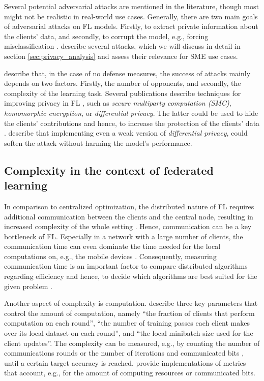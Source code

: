 Several potential adversarial attacks are mentioned in the literature, though most might not be realistic in real-world use cases. Generally, there are two main goals of adversarial attacks on FL models. Firstly, to extract private information about the clients' data, and secondly, to corrupt the model, e.g., forcing misclassification \citep{enthoven2021overview}. \citet{enthoven2021overview} describe several attacks, which we will discuss in detail in section \ref{sec:privacy_analysis} and assess their relevance for SME use cases.

\citet{sun2019can} describe that, in the case of no defense measures, the success of attacks mainly depends on two factors. Firstly, the number of opponents, and secondly, the complexity of the learning task. Several publications describe techniques for improving privacy in FL \citep{yang2019federated, naseri2020toward, sun2019can}, such as \emph{secure multiparty computation (SMC)}, \emph{homomorphic encryption}, or \emph{differential privacy}. The latter could be used to hide the clients' contributions and hence, to increase the protection of the clients' data \citep{yang2019federated}. \citet{sun2019can} describe that implementing even a weak version of \emph{differential privacy}, could soften the attack without harming the model's performance.

\subsection{Complexity in the context of federated learning\label{sec:literature_complexity}}
In comparison to centralized optimization, the distributed nature of FL requires additional communication between the clients and the central node, resulting in increased complexity of the whole setting \citep{mcmahan2017communication}. Hence, communication can be a key bottleneck of FL. Especially in a network with a large number of clients, the communication time can even dominate the time needed for the local computations on, e.g., the mobile devices \citep{li2020federated}. Consequently, measuring communication time is an important factor to compare distributed algorithms regarding efficiency and hence, to decide which algorithms are best suited for the given problem \citep{konevcny2016federated}.

Another aspect of complexity is computation. \citet{mcmahan2017communication} describe three key parameters that control the amount of computation, namely ``the fraction of clients that perform computation on each round'', ``the number of training passes each client makes over its local dataset on each round'', and ``the local minibatch size used for the client updates''. The complexity can be measured, e.g., by counting the number of communications rounds \citep{mcmahan2017communication} or the number of iterations and communicated bits \citep{konevcny2016federated, sattler2019robust}, until a certain target accuracy is reached. \citet{caldas2018leaf} provide implementations of metrics that account, e.g., for the amount of computing resources or communicated bits.


